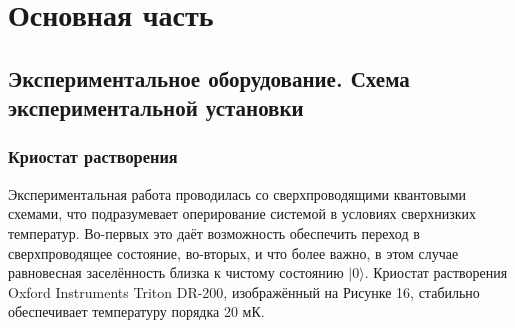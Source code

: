 \section{Основная часть}
\subsection{Экспериментальное оборудование. Схема экспериментальной установки}
\subsubsection{Криостат растворения}

Экспериментальная работа проводилась со сверхпроводящими квантовыми схемами, что подразумевает оперирование системой в условиях сверхнизких температур. Во-первых это даёт возможность обеспечить переход в сверхпроводящее состояние, во-вторых, и что более важно, в этом случае равновесная заселённость близка к чистому состоянию $|0\rangle$. Криостат растворения Oxford Instruments Triton DR-200, изображённый на Рисунке 16, стабильно обеспечивает температуру порядка 20 мК. 

